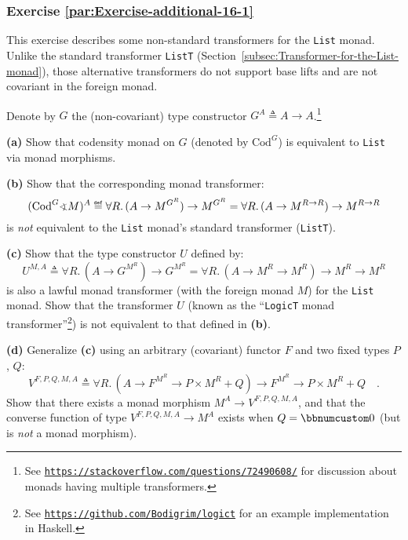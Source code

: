 \subsubsection{Exercise \label{par:Exercise-additional-16-1}\ref{par:Exercise-additional-16-1}}

This exercise describes some non-standard transformers for the \lstinline!List!
monad. Unlike
the standard transformer \lstinline!ListT! (Section~\ref{subsec:Transformer-for-the-List-monad}),
those alternative transformers do not support base lifts and are not
covariant in the foreign monad.

Denote by $G$ the (non-covariant) type constructor $G^{A}\triangleq A\rightarrow A$.\footnote{See \texttt{\href{https://stackoverflow.com/questions/72490608/}{https://stackoverflow.com/questions/72490608/}}
for discussion about monads having multiple transformers.}

\textbf{(a)} Show that codensity monad on $G$ (denoted by $\text{Cod}^{G}$)
is equivalent to \lstinline!List! via monad morphisms.

\textbf{(b)} Show that the corresponding monad transformer: 
\[
(\text{Cod}^{G}\varangle M)^{A}\triangleq\forall R.\,(A\rightarrow M^{G^{R}})\rightarrow M^{G^{R}}=\forall R.\,(A\rightarrow M^{R\rightarrow R})\rightarrow M^{R\rightarrow R}
\]
is \emph{not} equivalent to the \lstinline!List! monad\textsf{'}s standard
transformer (\lstinline!ListT!).

\textbf{(c)} Show that the type constructor $U$ defined by:
\[
U^{M,A}\triangleq\forall R.\,(A\rightarrow G^{M^{R}})\rightarrow G^{M^{R}}=\forall R.\,(A\rightarrow M^{R}\rightarrow M^{R})\rightarrow M^{R}\rightarrow M^{R}
\]
is also a lawful monad transformer (with the foreign monad $M$) for
the \lstinline!List! monad. Show that the transformer $U$ (known
as the \textsf{``}\lstinline!LogicT! monad transformer\textsf{''}\footnote{See \texttt{\href{https://github.com/Bodigrim/logict}{https://github.com/Bodigrim/logict}}
for an example implementation in Haskell.}) is not equivalent to that defined in \textbf{(b)}. 

\textbf{(d)} Generalize \textbf{(c)} using an arbitrary (covariant)
functor $F$ and two fixed types $P$, $Q$:
\[
V^{F,P,Q,M,A}\triangleq\forall R.\,(A\rightarrow F^{M^{R}}\rightarrow P\times M^{R}+Q)\rightarrow F^{M^{R}}\rightarrow P\times M^{R}+Q\quad.
\]
Show that there exists a monad morphism $M^{A}\rightarrow V^{F,P,Q,M,A}$,
and that the converse function of type $V^{F,P,Q,M,A}\rightarrow M^{A}$
exists when $Q=\bbnum 0$ (but is \emph{not} a monad morphism).

